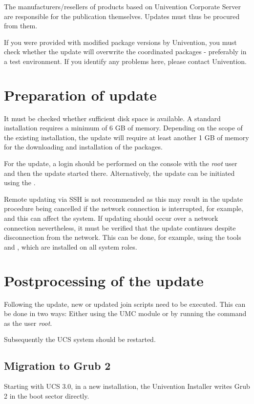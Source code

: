 The manufacturers/resellers of products based on Univention Corporate
Server are responsible for the publication themselves. Updates must
thus be procured from them.

If you were provided with modified package versions by Univention,
you must check whether the update will overwrite the coordinated
packages - preferably in a test environment. If you identify any
problems here, please contact Univention.


\chapter{Preparation of update}
It must be checked whether sufficient disk space is available. A
standard installation requires a minimum of 6 GB of memory. Depending
on the scope of the existing installation, the update will require at
least another 1 GB of memory for the downloading and installation of
the packages.

For the update, a login should be performed on the console with
the \emph{root} user and then the update started there. Alternatively,
the update can be initiated using the \ucsUMC{}.

Remote updating via SSH is not recommended as this may result in the
update procedure being cancelled if the network connection is
interrupted, for example, and this can affect the system. If updating
should occur over a network connection nevertheless, it must be
verified that the update continues despite disconnection from the
network. This can be done, for example, using the
tools  and , which are installed on
all system roles.



\chapter{Postprocessing of the update}
Following the update, new or updated join scripts need to be executed.
This can be done in two ways: Either using the UMC module 
 or by running the command
 as the user \emph{root}.

Subsequently the UCS system should be restarted.

\section{Migration to Grub 2}
Starting with UCS 3.0, in a new installation, the Univention Installer writes Grub 2 in the
boot sector directly.

